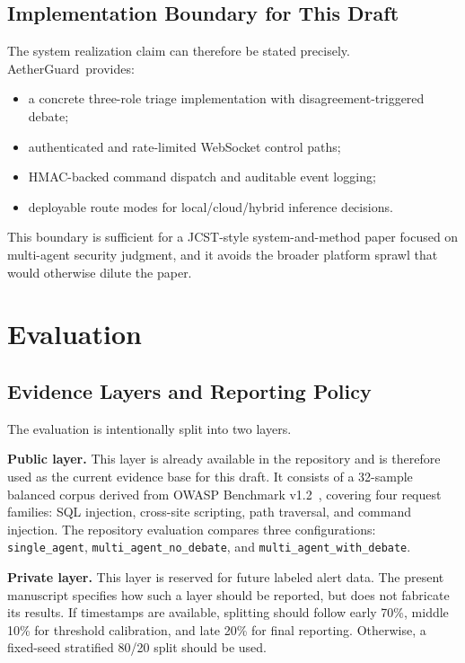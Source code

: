 \documentclass[pdflatex,sn-mathphys-num]{sn-jnl}
\newcommand{\system}{AetherGuard}
\begin{document}
\subsection{Implementation Boundary for This Draft}

The system realization claim can therefore be stated precisely. \system\ provides:
\begin{itemize}
  \item a concrete three-role triage implementation with disagreement-triggered debate;
  \item authenticated and rate-limited WebSocket control paths;
  \item HMAC-backed command dispatch and auditable event logging;
  \item deployable route modes for local/cloud/hybrid inference decisions.
\end{itemize}
This boundary is sufficient for a JCST-style system-and-method paper focused on multi-agent security judgment, and it avoids the broader platform sprawl that would otherwise dilute the paper.
\section{Evaluation}\label{sec:evaluation}

\subsection{Evidence Layers and Reporting Policy}

The evaluation is intentionally split into two layers.

\textbf{Public layer.} This layer is already available in the repository and is therefore used as the current evidence base for this draft. It consists of a 32-sample balanced corpus derived from OWASP Benchmark v1.2~\cite{owaspBenchmark2026}, covering four request families: SQL injection, cross-site scripting, path traversal, and command injection. The repository evaluation compares three configurations: \texttt{single\_agent}, \texttt{multi\_agent\_no\_debate}, and \texttt{multi\_agent\_with\_debate}.

\textbf{Private layer.} This layer is reserved for future labeled alert data. The present manuscript specifies how such a layer should be reported, but does not fabricate its results. If timestamps are available, splitting should follow early 70\%, middle 10\% for threshold calibration, and late 20\% for final reporting. Otherwise, a fixed-seed stratified 80/20 split should be used.
\end{document}
